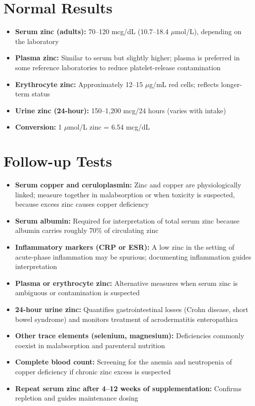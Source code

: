\section*{Normal Results}
\begin{itemize}
  \item \textbf{Serum zinc (adults):} 70--120 mcg/dL (10.7--18.4 $\mu$mol/L), depending on the laboratory
  \item \textbf{Plasma zinc:} Similar to serum but slightly higher; plasma is preferred in some reference laboratories to reduce platelet-release contamination
  \item \textbf{Erythrocyte zinc:} Approximately 12--15 $\mu$g/mL red cells; reflects longer-term status
  \item \textbf{Urine zinc (24-hour):} 150--1,200 mcg/24 hours (varies with intake)
  \item \textbf{Conversion:} 1 $\mu$mol/L zinc = 6.54 mcg/dL
\end{itemize}

\section*{Follow-up Tests}
\begin{itemize}
  \item \textbf{Serum copper and ceruloplasmin:} Zinc and copper are physiologically linked; measure together in malabsorption or when toxicity is suspected, because excess zinc causes copper deficiency
  \item \textbf{Serum albumin:} Required for interpretation of total serum zinc because albumin carries roughly 70\% of circulating zinc
  \item \textbf{Inflammatory markers (CRP or ESR):} A low zinc in the setting of acute-phase inflammation may be spurious; documenting inflammation guides interpretation
  \item \textbf{Plasma or erythrocyte zinc:} Alternative measures when serum zinc is ambiguous or contamination is suspected
  \item \textbf{24-hour urine zinc:} Quantifies gastrointestinal losses (Crohn disease, short bowel syndrome) and monitors treatment of acrodermatitis enteropathica
  \item \textbf{Other trace elements (selenium, magnesium):} Deficiencies commonly coexist in malabsorption and parenteral nutrition
  \item \textbf{Complete blood count:} Screening for the anemia and neutropenia of copper deficiency if chronic zinc excess is suspected
  \item \textbf{Repeat serum zinc after 4--12 weeks of supplementation:} Confirms repletion and guides maintenance dosing
\end{itemize}

